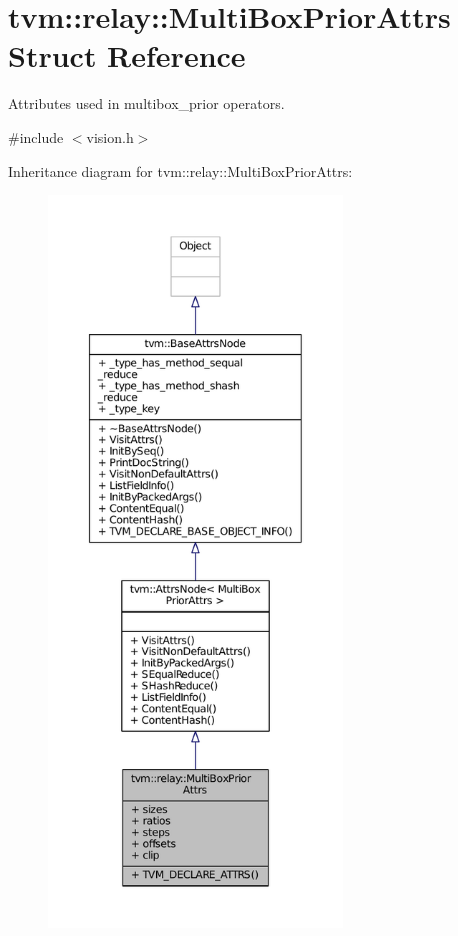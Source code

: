 \hypertarget{structtvm_1_1relay_1_1MultiBoxPriorAttrs}{}\section{tvm\+:\+:relay\+:\+:Multi\+Box\+Prior\+Attrs Struct Reference}
\label{structtvm_1_1relay_1_1MultiBoxPriorAttrs}


Attributes used in multibox\+\_\+prior operators.  




{\ttfamily \#include $<$vision.\+h$>$}



Inheritance diagram for tvm\+:\+:relay\+:\+:Multi\+Box\+Prior\+Attrs\+:
\nopagebreak
\begin{figure}[H]
\begin{center}
\leavevmode
\includegraphics[height=550pt]{structtvm_1_1relay_1_1MultiBoxPriorAttrs__inherit__graph}
\end{center}
\end{figure}


